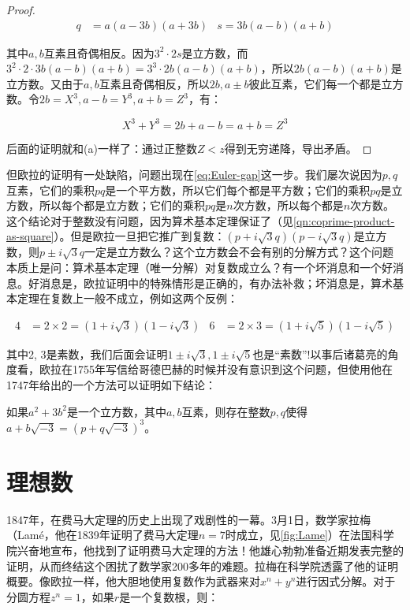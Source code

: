 \documentclass[b5paper]{ctexart}
\begin{document}
\begin{proof}
\begin{align*}
q &= a(a - 3b)(a + 3b)  &  s = 3b(a - b)(a + b)
\end{align*}

其中$a, b$互素且奇偶相反。因为$3^2\cdot 2s$是立方数，而$3^2\cdot 2 \cdot 3b(a - b)(a + b) = 3^3 \cdot 2b(a - b)(a + b)$，所以$2b(a - b)(a + b)$是立方数。又由于$a, b$互素且奇偶相反，所以$2b, a \pm b$彼此互素，它们每一个都是立方数。令$2b = X^3, a - b = Y^3, a + b = Z^3$，有：

\[
X^3 + Y^3 = 2b + a - b = a + b = Z^3
\]

后面的证明就和(a)一样了：通过正整数$Z < z$得到无穷递降，导出矛盾。
\end{proof}

但欧拉的证明有一处缺陷，问题出现在\cref{eq:Euler-gap}这一步。我们屡次说因为$p, q$互素，它们的乘积$pq$是一个平方数，所以它们每个都是平方数；它们的乘积$pq$是立方数，所以每个都是立方数；它们的乘积$pq$是$n$次方数，所以每个都是$n$次方数。这个结论对于整数没有问题，因为算术基本定理保证了（见\cref{qn:coprime-product-as-square}）。但是欧拉一旦把它推广到复数：$(p + i\sqrt{3}q)(p - i\sqrt{3}q)$是立方数，则$p \pm i\sqrt{3}q$一定是立方数么？这个立方数会不会有别的分解方式？这个问题本质上是问：算术基本定理（唯一分解）对复数成立么？有一个坏消息和一个好消息。好消息是，欧拉证明中的特殊情形是正确的，有办法补救；坏消息是，算术基本定理在复数上一般不成立，例如这两个反例：

\begin{align*}
4 &= 2 \times 2 = (1 + i\sqrt{3})(1 - i\sqrt{3}) & 6 &= 2 \times 3 = (1 + i\sqrt{5})(1 - i\sqrt{5})
\end{align*}

其中2, 3是素数，我们后面会证明$1 \pm i\sqrt{3}, 1 \pm i\sqrt{5}$也是“素数”!以事后诸葛亮的角度看，欧拉在1755年写信给哥德巴赫的时候并没有意识到这个问题，但使用他在1747年给出的一个方法可以证明如下结论：

\begin{lemma}[欧拉]
如果$a^2 + 3b^2$是一个立方数，其中$a, b$互素，则存在整数$p, q$使得$a + b\sqrt{-3} = (p + q\sqrt{-3})^3$。
\end{lemma}

\section{理想数}

1847年，在费马大定理的历史上出现了戏剧性的一幕。3月1日，数学家拉梅（Lamé，他在1839年证明了费马大定理$n = 7$时成立，见\cref{fig:Lame}）在法国科学院兴奋地宣布，他找到了证明费马大定理的方法！他雄心勃勃准备近期发表完整的证明，从而终结这个困扰了数学家200多年的难题。拉梅在科学院透露了他的证明概要。像欧拉一样，他大胆地使用复数作为武器来对$x^n + y^n$进行因式分解。对于分圆方程$z^n = 1$，如果$r$是一个复数根，则：
\end{document}

